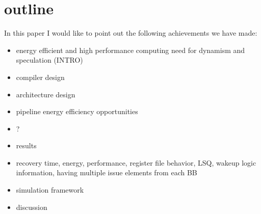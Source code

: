 \section{outline}
\label{sec:outline}

In this paper I would like to point out the following achievements we have
made:

\begin{itemize} 
    \item energy efficient and high performance computing need for dynamism and
speculation (INTRO)
    \item compiler design
    \item architecture design
    \item pipeline energy efficiency opportunities
    \item ?
    \item results
    \item recovery time, energy, performance, register file behavior, LSQ,
wakeup logic information, having multiple issue elements from each BB
    \item simulation framework
    \item discussion
\end{itemize}
